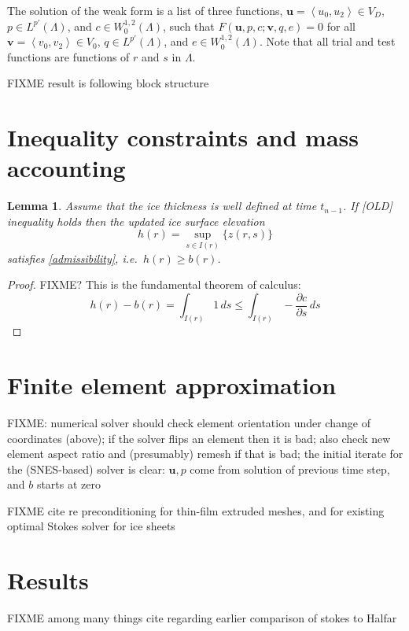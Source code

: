 \documentclass[letterpaper,final,12pt,reqno]{amsart}
\newcommand{\bu}{\mathbf{u}}
\newcommand{\bv}{\mathbf{v}}
\newtheorem{lemma}{Lemma}
\begin{document}
The solution of the weak form is a list of three functions, $\bu = \left<u_0,u_2\right> \in V_D$, $p\in L^{p'}(\Lambda)$, and $c\in W^{1,2}_0(\Lambda)$, such that $F(\bu,p,c;\bv,q,e) = 0$ for all $\bv = \left<v_0,v_2\right> \in V_0$,  $q\in L^{p'}(\Lambda)$, and $e \in W^{1,2}_0(\Lambda)$.  Note that all trial and test functions are functions of $r$ and $s$ in $\Lambda$.

FIXME result is following block structure


\section{Inequality constraints and mass accounting} \label{sec:inequalities}

\begin{lemma}
Assume that the ice thickness is well defined at time $t_{n-1}$.  If [OLD] inequality holds then the updated ice surface elevation
    $$h(r) = \sup_{s\in I(r)}\{z(r,s)\}$$
satisfies \eqref{admissibility}, i.e.~$h(r)\ge b(r)$.
\end{lemma}

\begin{proof}
FIXME? This is the fundamental theorem of calculus:
    $$h(r) - b(r) = \int_{I(r)} 1\,ds \le \int_{I(r)} - \frac{\partial c}{\partial s}\,ds$$
\end{proof}


\section{Finite element approximation}  \label{sec:finiteelement}

FIXME: numerical solver should check element orientation under change of coordinates (above); if the solver flips an element then it is bad; also check new element aspect ratio and (presumably) remesh if that is bad; the initial iterate for the (SNES-based) solver is clear: $\bu,p$ come from solution of previous time step, and $b$ starts at zero

FIXME cite \cite{Tuminaroetal2016} re preconditioning for thin-film extruded meshes, and \cite{IsaacStadlerGhattas2015} for existing optimal Stokes solver for ice sheets


\section{Results}

FIXME among many things cite \cite{LeysingerGudmundsson2004} regarding earlier comparison of stokes to Halfar
\end{document}
